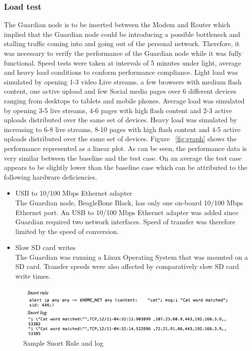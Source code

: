 \subsubsection{Load test}
\label{sec:eval:loadtest}
The Guardian node is to be inserted between the Modem and Router which implied that the Guardian node could be introducing a possible bottleneck and stalling traffic coming into and going out of the personal network. Therefore, it was necessary to verify the performance of the Guardian node while it was fully functional. Speed tests were taken at intervals of 5 minutes under light, average and heavy load conditions to conform performance compliance. Light load was simulated by opening 1-3 video Live streams, a few browsers with medium flash content, one active upload and few Social media pages over 6 different devices ranging from desktops to tablets and mobile phones. Average load was simulated by opening 3-5 live streams, 4-6 pages with high flash content and 2-3 active uploads distributed over the same set of devices. Heavy load was simulated by increasing to 6-8 live streams, 8-10 pages with high flash content and 4-5 active uploads distributed over the same set of devices. Figure ~\ref{fig:graph} shows the performance represented as a linear plot. As can be seen, the performance data is very similar between the baseline and the test case. On an average the test case appears to be slightly lower than the baseline case which can be attributed to the following hardware deficiencies.\\
\begin{itemize}
    \item USB to 10/100 Mbps Ethernet adapter\\
    The Guardian node, BeagleBone Black, has only one on-board 10/100 Mbps Ethernet port. An USB to 10/100 Mbps Ethernet adapter was added since Guardian required two network interfaces. Speed of transfer was therefore limited by the speed of conversion.
    \item Slow SD card writes\\
    The Guardian was running a Linux Operating System that was mounted on a SD card. Transfer speeds were also affected by comparatively slow SD card write times.
\end{itemize}
\begin{figure}
    \centering
    \includegraphics[width=0.95\linewidth]{figs/catrule.png}
    \caption{Sample Snort Rule and log}
    \label{fig:snortrule}
\end{figure}

